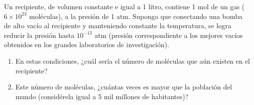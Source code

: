 Un recipiente, de volumen constante e igual a 1 litro, contiene 1 mol de un gas ($6 \times 10^{23}$ moléculas), a la presión de 1 atm. Suponga que conectando una bomba de alto vacío al recipiente y manteniendo constante la temperatura, se logra reducir la presión hasta $10^{-13}$ atm (presión correspondiente a los mejores vacíos obtenidos en los grandes laboratorios de investigación).
\begin{enumerate}
    \item En estas condiciones, ¿cuál sería el número de moléculas que aún existen en el recipiente?
    \item Este número de moléculas, ¿cuántas veces es mayor que la población del mundo (considérela igual a 5 mil millones de habitantes)?
\end{enumerate}